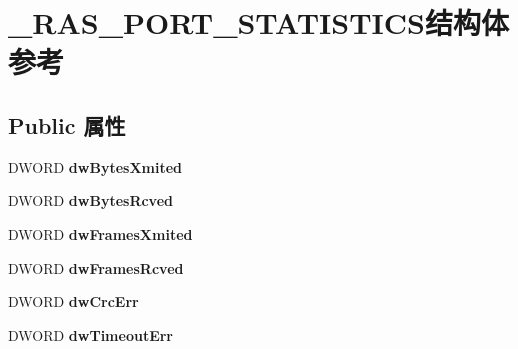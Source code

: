 \hypertarget{struct___r_a_s___p_o_r_t___s_t_a_t_i_s_t_i_c_s}{}\section{\+\_\+\+R\+A\+S\+\_\+\+P\+O\+R\+T\+\_\+\+S\+T\+A\+T\+I\+S\+T\+I\+C\+S结构体 参考}
\label{struct___r_a_s___p_o_r_t___s_t_a_t_i_s_t_i_c_s}
\subsection*{Public 属性}
\begin{DoxyCompactItemize}
\item 
\mbox{\label{struct___r_a_s___p_o_r_t___s_t_a_t_i_s_t_i_c_s_a8764d77169045db56f1065827d2818ed}} 
D\+W\+O\+RD {\bfseries dw\+Bytes\+Xmited}
\item 
\mbox{\label{struct___r_a_s___p_o_r_t___s_t_a_t_i_s_t_i_c_s_a10b6f335caddfcb9596a0e2bf3f9b772}} 
D\+W\+O\+RD {\bfseries dw\+Bytes\+Rcved}
\item 
\mbox{\label{struct___r_a_s___p_o_r_t___s_t_a_t_i_s_t_i_c_s_afa3fc5d7a76d39d7e4ba3586e56ef45b}} 
D\+W\+O\+RD {\bfseries dw\+Frames\+Xmited}
\item 
\mbox{\label{struct___r_a_s___p_o_r_t___s_t_a_t_i_s_t_i_c_s_a73195d5b4ed8a7f20529e7c546d654d7}} 
D\+W\+O\+RD {\bfseries dw\+Frames\+Rcved}
\item 
\mbox{\label{struct___r_a_s___p_o_r_t___s_t_a_t_i_s_t_i_c_s_a802b49f37ca5f056435d7b35dd103b56}} 
D\+W\+O\+RD {\bfseries dw\+Crc\+Err}
\item 
\mbox{\label{struct___r_a_s___p_o_r_t___s_t_a_t_i_s_t_i_c_s_ae823bd6f192e91bf61ea93eaa827678c}} 
D\+W\+O\+RD {\bfseries dw\+Timeout\+Err}
\item 
\mbox{\label{struct___r_a_s___p_o_r_t___s_t_a_t_i_s_t_i_c_s_aac77fb1ecfab0e47d7f69fc77ee21542}} 

\end{DoxyCompactItemize}
